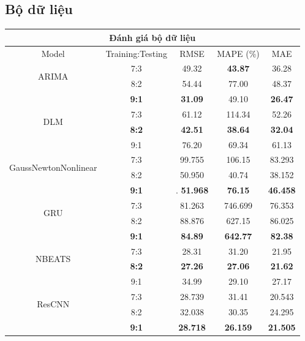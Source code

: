 \documentclass[conference]{IEEEtran}
\begin{document}
\subsection{Bộ dữ liệu}
\begin{table}[H]
    \centering
    \begin{tabular}{|c|c|c|c|c|}
        \hline
        \multicolumn{5}{|c|}{\textbf{Đánh giá bộ dữ liệu}}                                            \\
        \hline
        \centering Model                      & Training:Testing & RMSE    & MAPE (\%)      & MAE     \\
        \hline
        \multirow{2}{*}{ARIMA}                & 7:3              & 49.32   & \textbf{43.87} & 36.28   \\ & 8:2 & 54.44 & 77.00 & 48.37 \\ & \textbf{9:1} & \textbf{31.09} & 49.10 & \textbf{26.47} \\
        \hline
        \multirow{2}{*}{DLM}                  & 7:3              & 61.12   & 114.34         & 52.26   \\ & \textbf{8:2} & \textbf{42.51} & \textbf{38.64} & \textbf{32.04} \\ & 9:1 & 76.20 &  69.34 & 61.13\\
        \hline
        \multirow{2}{*}{GaussNewtonNonlinear} & 7:3              & 99.755  & 106.15         & 83.293  \\ &  8:2 & 50.950 & 40.74 & 38.152  \\ & \textbf{9:1} &. \textbf{51.968} & \textbf{76.15} & \textbf{46.458}\\
        \hline
        \multirow{2}{*}{GRU}                  & 7:3              & 81.263  & 746.699        & 76.353  \\ & 8:2 & 88.876 & 627.15 & 86.025 \\ & \textbf{9:1} & \textbf{84.89} & \textbf{642.77} & \textbf{82.38}\\
        \hline
        \multirow{2}{*}{NBEATS}               & 7:3              & 28.31   & 31.20          & 21.95   \\ & \textbf{8:2} & \textbf{27.26} & \textbf{27.06} & \textbf{21.62} \\ &  9:1 & 34.99 & 29.10 & 27.17\\
        \hline
        \multirow{2}{*}{ResCNN}               & 7:3              & 28.739  & 31.41          & 20.543  \\ & 8:2 & 32.038	& 30.35 & 24.295\\ & \textbf{9:1} & \textbf{28.718} & \textbf{26.159} & \textbf{21.505}\\

\end{tabular}
\end{table}
\end{document}
